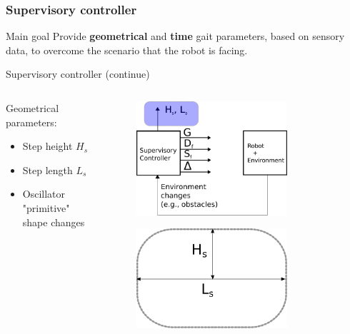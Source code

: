 \documentclass{beamer}
\begin{document}
\begin{frame}\frametitle{Supervisory controller}
	\begin{block}{Main goal}
		\Large Provide \textbf{geometrical} and \textbf{time} gait parameters, based on sensory data, to overcome the scenario that the robot is facing.
	\end{block}
\end{frame}



\begin{frame}{Supervisory controller (continue)}
		\begin{columns}
		\hspace{1cm}
		\begin{column}{0.5\textwidth}
		Geometrical parameters:
		\begin{itemize}
			\setlength\itemsep{3em}
			\item Step height $H_s$
			\item Step length $L_s$
			\item Oscillator "primitive" shape changes
		\end{itemize}	
		
		\end{column}
		\begin{column}{0.5\textwidth}
			\begin{figure}[ht]\centering
				\includegraphics[width=0.75\textwidth]{images/Supervisory.pdf}
			\end{figure}
			\begin{figure}[ht]\centering
				\includegraphics[width=0.75\textwidth]{images/PrimitiveShape.pdf}
			\end{figure}	
		\end{column}
		\end{columns}
\end{frame}
\end{document}
